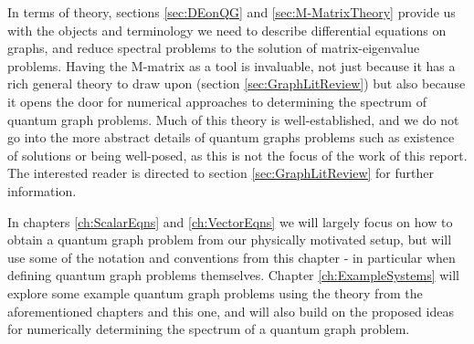 In terms of theory, sections \ref{sec:DEonQG} and \ref{sec:M-MatrixTheory} provide us with the objects and terminology we need to describe differential equations on graphs, and reduce spectral problems to the solution of matrix-eigenvalue problems.
Having the M-matrix as a tool is invaluable, not just because it has a rich general theory to draw upon (section \ref{sec:GraphLitReview}) but also because it opens the door for numerical approaches to determining the spectrum of quantum graph problems.
Much of this theory is well-established, and we do not go into the more abstract details of quantum graphs problems such as existence of solutions or being well-posed, as this is not the focus of the work of this report.
The interested reader is directed to section \ref{sec:GraphLitReview} for further information. \newline

In chapters \ref{ch:ScalarEqns} and \ref{ch:VectorEqns} we will largely focus on how to obtain a quantum graph problem from our physically motivated setup, but will use some of the notation and conventions from this chapter - in particular when defining quantum graph problems themselves.
Chapter \ref{ch:ExampleSystems} will explore some example quantum graph problems using the theory from the aforementioned chapters and this one, and will also build on the proposed ideas for numerically determining the spectrum of a quantum graph problem.